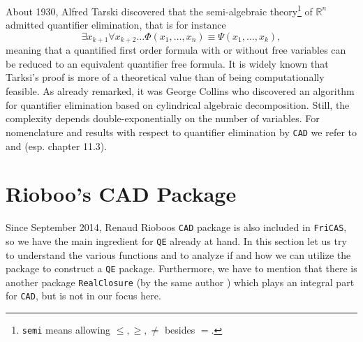 \documentclass[12pt,a4paper]{article}
\newcommand{\QE}{{\tt QE}}
\newcommand{\RR}[1]{\mathbb{R}^{#1}}
\begin{document}
About 1930, Alfred Tarski discovered \cite{TAR51} that the semi-algebraic 
theory\footnote{{\tt semi} means allowing $\leq,\geq,\neq$ besides $=$.} 
of $\RR n$ admitted quantifier elimination, that is for instance
%
\begin{equation}
       \exists x_{k+1}\forall x_{k+2}\ldots \Phi(x_1,\ldots,x_n) \equiv
       \Psi(x_1,\ldots,x_k),
\end{equation}
%
meaning that a quantified first order formula with or without free variables
can be reduced to an equivalent quantifier free formula. It is widely known
that Tarksi's proof is more of a theoretical value than of being computationally
feasible. As already remarked, it was George Collins who discovered an algorithm
for quantifier elimination based on cylindrical algebraic decomposition. Still,
the complexity depends double-exponentially on the number of variables. For
nomenclature and results with respect to quantifier elimination by {\tt CAD}
we refer to \cite{BCW99} and \cite{ARAG} (esp. chapter 11.3).

\section{Rioboo's CAD Package}
Since September 2014, Renaud Rioboos {\tt CAD} package is also included in 
{\tt FriCAS}, so we have the main ingredient for {\QE} already at hand. In
this section let us try to understand the various functions and to analyze
if and how we can utilize the package to construct a {\tt QE} package. 
Furthermore, we have to mention that there is another package {\tt RealClosure} 
(by the same author \cite{RIO91}) which plays an integral part for {\tt CAD},
but is not in our focus here. 
\end{document}
